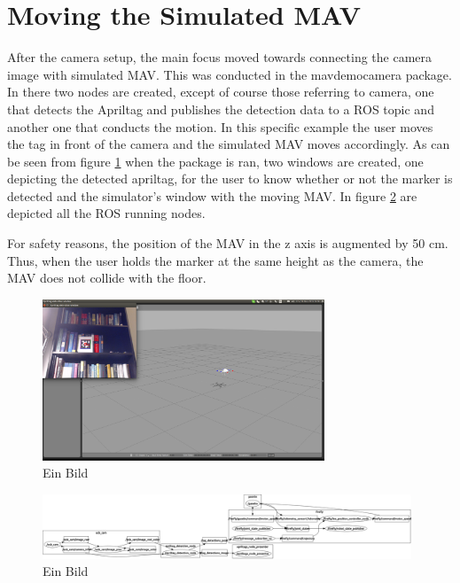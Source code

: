 \section{Moving the Simulated MAV}
\label{sec:movingMAV}
After the camera setup, the main focus moved towards connecting the camera image with simulated MAV. This was conducted in the mav\textunderscore demo\textunderscore camera package. In there two nodes are created, except of course those referring to camera, one that detects the Apriltag and publishes the detection data to a ROS topic and another one that conducts the motion. In this specific example the user moves the tag in front of the camera and the simulated MAV moves accordingly. As can be seen from figure \ref{pics:mav_demo_camera} when the package is ran, two windows are created, one depicting the detected apriltag, for the user to know whether or not the marker is detected and the simulator's window with the moving MAV. In figure \ref{pics:mav_demo_camera_rosgraph} are depicted all the ROS running nodes. 

For safety reasons, the position of the MAV in the z axis is augmented by 50 cm. 
Thus, when the user holds the marker at the same height as the camera, the MAV does not collide with the floor.

\begin{figure}
   \centering
   \includegraphics[width=0.75\textwidth]{images/mav_demo_camera.pdf}
   \caption{Ein Bild}
   \label{pics:mav_demo_camera}
\end{figure}

\begin{figure}
   \centering
   \includegraphics[width=0.98\textwidth]{images/mav_demo_camera_rosgraph.pdf}
   \caption{Ein Bild}
   \label{pics:mav_demo_camera_rosgraph}
\end{figure}

